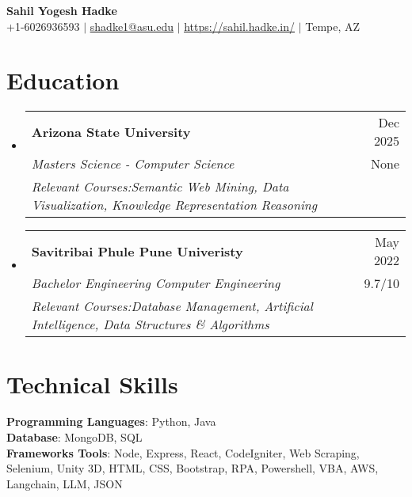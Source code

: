 \documentclass[letterpaper,11pt]{article}
\makeatletter
\newcommand{\resumeSubheadingUpdated}[5]{
\vspace{-2pt}\item
    \begin{tabular*}{0.97\textwidth}[t]{l@{\extracolsep{\fill}}r}
      \textbf{#1} & #2 \\
      \textit{\small#3} & {\small #4} \\
      \textit{\small#5}
    \end{tabular*}\vspace{-3pt}
}
\newcommand{\resumeSubHeadingListStart}{\begin{itemize}[leftmargin=0.15in, label={}]}
\newcommand{\resumeSubHeadingListEnd}{\end{itemize}}
\makeatother
\begin{document}

\begin{center}
    \textbf{\huge Sahil Yogesh Hadke} \\ \vspace{1pt}
    \small +1-6026936593 $|$ \href{mailto:shadke1@asu.edu}{\underline{shadke1@asu.edu}} $|$ 
    \href{https://sahil.hadke.in/}{\underline{https://sahil.hadke.in/}} $|$
    Tempe, AZ
\end{center}


\section{Education}
  \resumeSubHeadingListStart
  
  
  
  \resumeSubheadingUpdated
  {Arizona State University}{Dec 2025}
    {Masters Science - Computer Science}{None}
    {Relevant Courses:{Semantic Web Mining, Data Visualization, Knowledge Representation Reasoning}
    }
  
  \resumeSubheadingUpdated
  {Savitribai Phule Pune Univeristy}{May 2022}
    {Bachelor Engineering Computer Engineering}{9.7/10}
    {Relevant Courses:{Database Management, Artificial Intelligence, Data Structures \& Algorithms}
    }
  \resumeSubHeadingListEnd



\section{Technical Skills}
 \begin{itemize}[leftmargin=0.15in, label={}]
    \small{\item{
    \textbf{Programming Languages}{: Python, Java} \\ \textbf{Database}{: MongoDB, SQL} \\ \textbf{Frameworks Tools}{: Node, Express, React, CodeIgniter, Web Scraping, Selenium, Unity 3D, HTML, CSS, Bootstrap, RPA, Powershell, VBA, AWS, Langchain, LLM, JSON} \\  
    }}
 \end{itemize}
\end{document}
